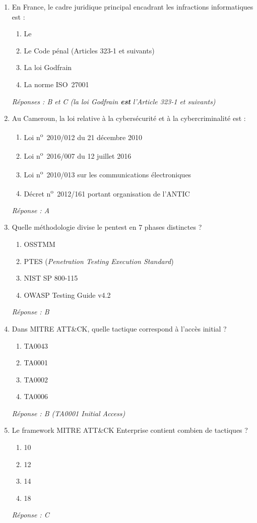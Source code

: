 \begin{enumerate}

\item En France, le cadre juridique principal encadrant les infractions
      informatiques est :
\begin{enumerate}[label=\Alph*.]
    \item Le 
    \item Le Code pénal (Articles 323-1 et suivants)
    \item La loi Godfrain
    \item La norme ISO~27001
\end{enumerate}
\textit{Réponses : B et C (la loi Godfrain \textbf{est} l'Article 323-1 et suivants)}

\item Au Cameroun, la loi relative à la cybersécurité et à la cybercriminalité est :
\begin{enumerate}[label=\Alph*.]
    \item Loi n\textsuperscript{o}~2010/012 du 21 décembre 2010
    \item Loi n\textsuperscript{o}~2016/007 du 12 juillet 2016
    \item Loi n\textsuperscript{o}~2010/013 sur les communications électroniques
    \item Décret n\textsuperscript{o}~2012/161 portant organisation de l'ANTIC
\end{enumerate}
\textit{Réponse : A}

\item Quelle méthodologie divise le pentest en 7 phases distinctes ?
\begin{enumerate}[label=\Alph*.]
    \item OSSTMM
    \item PTES (\textit{Penetration Testing Execution Standard})
    \item NIST SP 800-115
    \item OWASP Testing Guide v4.2
\end{enumerate}
\textit{Réponse : B}

\item Dans MITRE ATT\&CK, quelle tactique correspond à l'accès initial ?
\begin{enumerate}[label=\Alph*.]
    \item TA0043
    \item TA0001
    \item TA0002
    \item TA0006
\end{enumerate}
\textit{Réponse : B (TA0001 Initial Access)}

\item Le framework MITRE ATT\&CK Enterprise contient combien de tactiques ?
\begin{enumerate}[label=\Alph*.]
    \item 10
    \item 12
    \item 14
    \item 18
\end{enumerate}
\textit{Réponse : C}

\end{enumerate}

